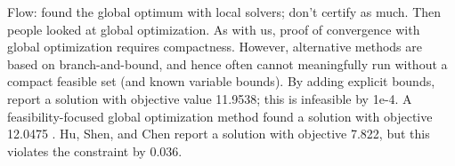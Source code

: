 \vspace{1cm}

Flow: \cite{RM1978} found the global optimum with local solvers; don't certify as much. Then people looked at global optimization. As with us, proof of convergence with global optimization requires compactness. However, alternative methods are based on branch-and-bound, and hence often cannot meaningfully run without a compact feasible set (and known variable bounds). By adding explicit bounds, \cite{WL2005} report a solution with objective value 11.9538; this is infeasible by 1e-4. A feasibility-focused global optimization method found a solution with objective 12.0475 \cite{Shen2008}. Hu, Shen, and Chen report a solution with objective 7.822, but this violates the constraint by 0.036.
\fi